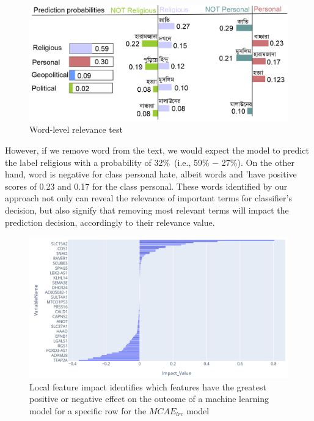 \begin{figure}[h]
    \vspace{-2mm}
	\centering
	\includegraphics[scale=0.6]{images/reli_explain.png}
	\caption{Word-level relevance test}%
    \label{fig:explain_term_wise_religious_hate}
	\vspace{-4mm}
\end{figure}

However, if we remove word %
from the text, we would expect the model to predict the label religious with a probability of 32\%~(i.e., 59\% $-$ 27\%). On the other hand, word %
is negative for class personal hate, albeit words %
and 'have positive scores of 0.23 and 0.17 for the class personal. These words identified by our approach not only can reveal the relevance of important terms for classifier’s decision, but also signify that removing most relevant terms will impact the prediction decision, accordingly to their relevance value. 

\begin{figure}[h]
    \centering
	\includegraphics[scale=0.8]{images/local_fi_1.png}
	\caption{Local feature impact identifies which features have the greatest positive or negative effect on the outcome of a machine learning model for a specific row for the $MCAE_{lrc}$ model}
    \label{fig:local_feature_impacts3}
\end{figure}

